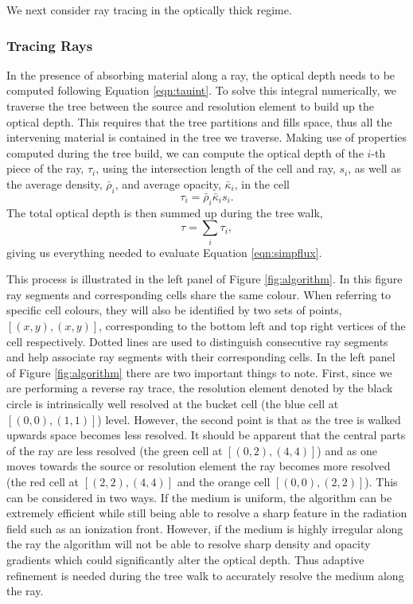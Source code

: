 \documentclass[fleq,usenatbib]{mnras}
\begin{document}
{We next consider ray tracing in the optically thick regime.

\subsubsection{Tracing Rays}
In the presence of absorbing material along a ray, the optical depth needs to 
be computed following
Equation \ref{eqn:tauint}. To solve this integral numerically, we traverse 
the tree between the source and resolution element to build up the optical 
depth. This requires that the tree partitions and fills space, thus all 
the intervening material is contained in the tree we traverse. Making 
use of properties computed during the tree build, we can compute the optical 
depth of the $i$-th piece of the ray, $\tau_i$, using the intersection length 
of the cell and ray, $s_i$, as well as the average density, $\bar{\rho}_i$, 
and average opacity, $\bar{\kappa}_i$, in the cell
\begin{equation}
\label{eqn:taui}
\tau_i = \bar{\rho}_i \bar{\kappa}_i s_i.
\end{equation}
The total optical depth is then summed up during the tree walk,
\begin{equation}
\label{eqn:tausum}
\tau = \sum_i \tau_i,
\end{equation}
giving us everything needed to evaluate Equation \ref{eqn:simpflux}. 

This process is illustrated in the left panel of Figure 
\ref{fig:algorithm}. In this figure ray segments and corresponding cells share 
the same colour. When referring to specific cell colours, they will also be 
identified by two sets of points, $[(x,y),(x,y)]$, corresponding to the bottom 
left and top right vertices of the cell respectively. Dotted lines are used to 
distinguish consecutive ray segments and help associate ray segments with 
their corresponding cells. In the left panel of Figure \ref{fig:algorithm} 
there are two important things to note. First, since we are performing a 
reverse ray trace, the resolution element denoted by the black circle is 
intrinsically well resolved at the bucket cell (the blue cell at 
$[(0,0),(1,1)]$) level. However, the second point is that as the tree is 
walked upwards space becomes less resolved. It should be apparent that the 
central parts of the ray are less resolved (the green cell at $[(0,2),(4,4)]$) 
and as one moves towards the source or resolution element the ray becomes more 
resolved (the red cell at $[(2,2),(4,4)]$ and the orange cell 
$[(0,0),(2,2)]$). This can be considered in two ways. If the medium is 
uniform, the algorithm can be extremely efficient while still being able to 
resolve a sharp feature in the radiation field such as an ionization front. 
However, if the medium is highly irregular along the ray the algorithm will 
not be able to resolve sharp density and opacity gradients which could 
significantly alter the optical depth. Thus adaptive refinement is needed 
during the tree walk to accurately resolve the medium along the ray.

}
\end{document}
